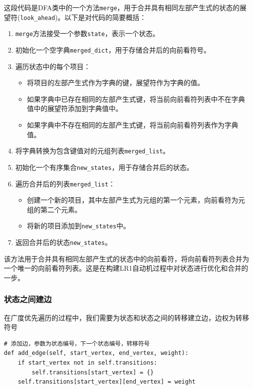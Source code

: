 \documentclass[lang=cn,11pt,a4paper]{elegantpaper}
\begin{document}
这段代码是DFA类中的一个方法\lstinline{merge}，用于合并具有相同左部产生式的状态的展望符(\lstinline{look_ahead})。以下是对代码的简要概括：
\begin{enumerate}
    \item \lstinline{merge}方法接受一个参数\lstinline{state}，表示一个状态。
    \item 初始化一个空字典\lstinline{merged_dict}，用于存储合并后的向前看符号。
    \item 遍历状态中的每个项目：
    \begin{itemize}
        \item 将项目的左部产生式作为字典的键，展望符作为字典的值。
        \item 如果字典中已存在相同的左部产生式键，将当前向前看符列表中不在字典值中的展望符添加到字典值中。
        \item 如果字典中不存在相同的左部产生式键，将当前向前看符列表作为字典值。
    \end{itemize}
    \item 将字典转换为包含键值对的元组列表\lstinline{merged_list}。
    \item 初始化一个有序集合\lstinline{new_states}，用于存储合并后的状态。
    \item 遍历合并后的列表\lstinline{merged_list}：
    \begin{itemize}
        \item 创建一个新的项目，其中左部产生式为元组的第一个元素，向前看符为元组的第二个元素。
        \item 将新的项目添加到\lstinline{new_states}中。
    \end{itemize}
    \item 返回合并后的状态\lstinline{new_states}。
\end{enumerate}

该方法用于合并具有相同左部产生式的状态中的向前看符，将向前看符列表合并为一个唯一的向前看符列表。这是在构建LR1自动机过程中对状态进行优化和合并的一步。

\subsubsection{状态之间建边}

在广度优先遍历的过程中，我们需要为状态和状态之间的转移建立边，边权为转移符号

\begin{lstlisting}
# 添加边，参数为状态编号，下一个状态编号，转移符号
def add_edge(self, start_vertex, end_vertex, weight):
    if start_vertex not in self.transitions:
        self.transitions[start_vertex] = {}
    self.transitions[start_vertex][end_vertex] = weight
\end{lstlisting}
\end{document}
